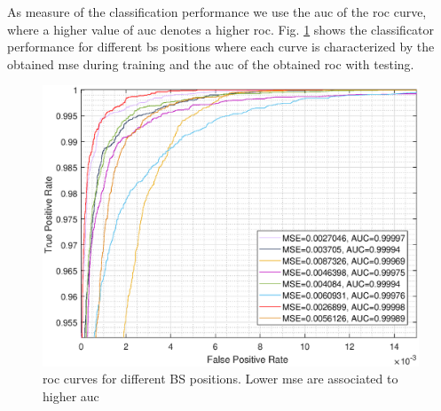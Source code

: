 \documentclass[draftcls,onecolumn,12pt]{IEEEtran}
\begin{document}
As measure of the classification performance we use the \ac{auc} of the \ac{roc} curve, where a higher value of \ac{auc} denotes a higher \ac{roc}. Fig. \ref{fig:mseVSauc} shows the classificator performance for different \ac{bs} positions where each curve is characterized by the obtained \ac{mse} during training and the \ac{auc} of the obtained \ac{roc} with testing.

\begin{figure}
    \centering
    \includegraphics[width=0.5\columnwidth]{mseVSauc.eps}
    \caption{\ac{roc} curves for different BS positions. Lower \ac{mse} are associated to higher \ac{auc}}
    \label{fig:mseVSauc}
\end{figure}

\printbibliography
\end{document}
